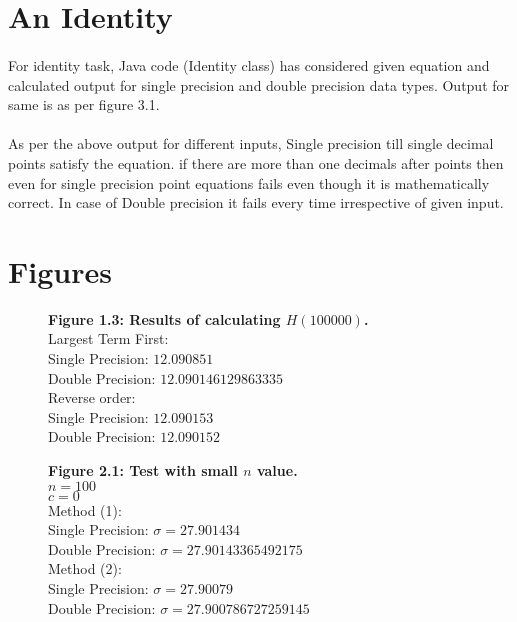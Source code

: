 \documentclass[12pt]{article}
\begin{document}
\section{An Identity}
\paragraph{}For identity task, Java code (Identity class) has considered given equation and calculated output for single precision and double precision data types. Output for same is as per figure 3.1. \\

\paragraph{} As per the above output for different inputs, Single precision till single decimal points satisfy the equation. if there are more than one decimals after points then even for single precision point equations fails even though it is mathematically correct. In case of Double precision it fails every time irrespective of given input.

\section{Figures}
\begin{figure}[h]
	\textbf{Figure 1.3: Results of calculating $H(100000)$.}\\
	Largest Term First:\\
	Single Precision: $12.090851$\\
	Double Precision: $12.090146129863335$\\
	
	Reverse order:\\
	Single Precision: $12.090153$\\
	Double Precision: $12.090152$	
\end{figure}

\begin{figure}[h]
	\textbf{Figure 2.1: Test with small $n$ value.}\\
	$n=100$\\
	$c=0$\\
	
	Method (1):\\
	Single Precision: $\sigma=27.901434$\\
	Double Precision: $\sigma=27.90143365492175$\\
	
	Method (2):\\
	Single Precision: $\sigma=27.90079$\\
	Double Precision: $\sigma=27.900786727259145$
\end{figure}
\end{document}
